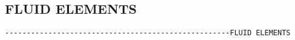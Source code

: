 

\subsection{FLUID ELEMENTS}
\begin{verbatim}
----------------------------------------------------FLUID ELEMENTS
\end{verbatim}


